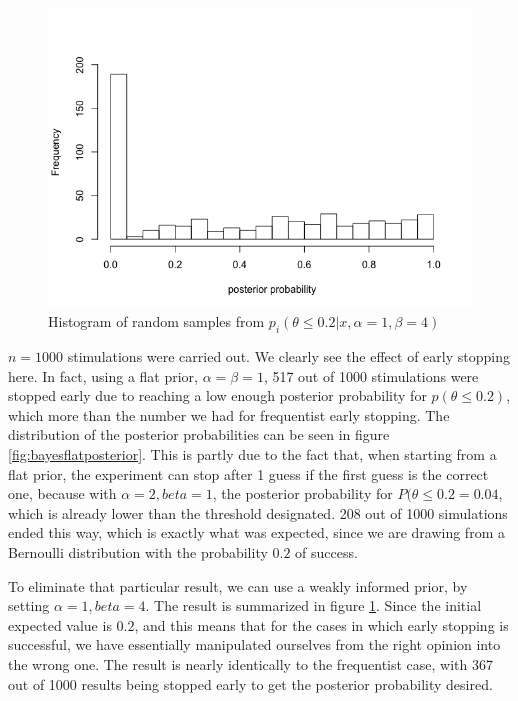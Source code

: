 \begin{figure}[h] 
\begin{center}
\includegraphics[scale=0.5]{bayesstop14allpost.png}
	\caption{Histogram of random samples from $p_i(\theta\leq 0.2|x,\alpha=1, \beta=4)$}
	\label{fig:bayes14posterior}
\end{center}	
\end{figure}

$n=1000$ stimulations were carried out. We clearly see the effect of early stopping here. In fact, using a flat prior, $\alpha=\beta=1$, 517 out of 1000 stimulations were stopped early due to reaching a low enough posterior probability for $p(\theta \leq 0.2)$, which more than the number we had for frequentist early stopping. The distribution of the posterior probabilities can be seen in figure \ref{fig:bayesflatposterior}. This is partly due to the fact that, when starting from a flat prior, the  experiment can stop after 1 guess if the first guess is the correct one, because with $\alpha = 2, beta=1$, the posterior probability for $P(\theta\leq 0.2 = 0.04$, which is already lower than the threshold designated. 208 out of 1000 simulations ended this way, which is exactly what was expected, since we are drawing from a Bernoulli distribution with the probability $0.2$ of success. 

To eliminate that particular result, we can use a weakly informed prior, by setting $\alpha = 1, beta=4$. The result is summarized in figure \ref{fig:bayes14posterior}. Since the initial expected value is $0.2$, and this means that for the cases in which early stopping is successful, we have essentially manipulated ourselves from the right opinion into the wrong one. The result is nearly identically to the frequentist case, with 367 out of 1000 results being stopped early to get the posterior probability desired.


